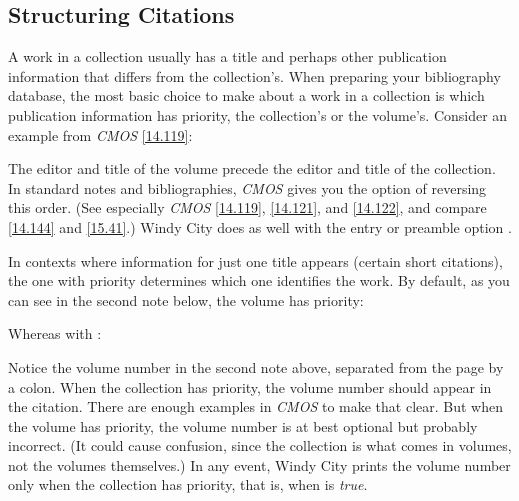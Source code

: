\documentclass[11pt,letterpaper,oneside]{article}
\begin{document}
\subsection{Structuring Citations}
\label{collorder}

A work in a collection usually has a title and perhaps other
publication information that differs from the collection's. When
preparing your bibliography database, the most basic choice to make
about a work in a collection is which publication information has
priority, the collection's or the volume's. Consider an example from
\textit{CMOS} \ref{14.119}:

\begin{citebib}
\item \cite{armstrong2014}
\end{citebib}

\noindent The editor and title of the volume precede the editor and
title of the collection. In standard notes and bibliographies,
\textit{CMOS} gives you the option of reversing this order. (See
especially \textit{CMOS} \ref{14.119}, \ref{14.121}, and \ref{14.122},
and compare \ref{14.144} and \ref{15.41}.) Windy City does as well
with the entry or preamble option .

\begin{citebib}
\item \cite{armstrong2014}
\end{citebib}

In contexts where information for just one title appears (certain
short citations), the one with priority determines which one
identifies the work. By default, as you can see in the second note
below, the volume has priority:

\begin{citeonly}
\item \cite{armstrong2014}
\item \cite[45]{armstrong2014}
\end{citeonly}

\noindent Whereas with :

\begin{citeonly}
\item \cite{armstrong2014}
\item \cite[45]{armstrong2014}
\end{citeonly}

Notice the volume number in the second note above, separated from the
page by a colon. When the collection has priority, the volume number
should appear in the citation. There are enough examples in
\textit{CMOS} to make that clear. But when the volume has priority,
the volume number is at best optional but probably incorrect. (It
could cause confusion, since the collection is what comes in volumes,
not the volumes themselves.) In any event, Windy City prints the
volume number only when the collection has priority, that is, when
 is \textit{true}.
\end{document}
